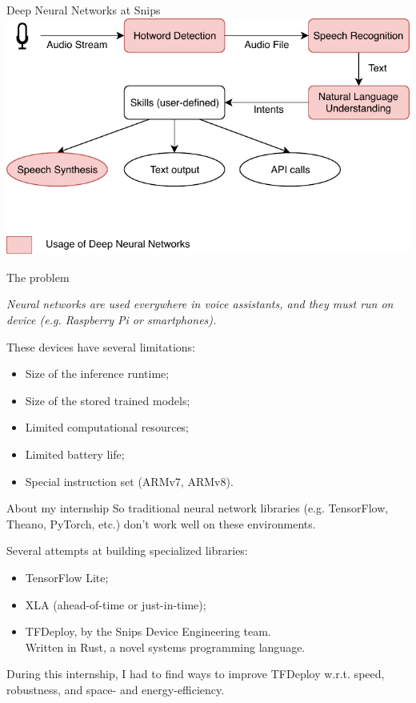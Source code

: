 \documentclass{beamer}
\begin{document}
\begin{frame}{Deep Neural Networks at Snips}
\centering
\vspace{1em}
\includegraphics[width=.9\textwidth]{snips-pipeline.pdf}
\end{frame}

\begin{frame}{The problem}
    \begin{block}{}
    \textit{Neural networks are used everywhere in voice assistants, and they must run on device (e.g. Raspberry Pi or smartphones).}
    \end{block}
    
    \bigskip
    These devices have several limitations:
    \begin{itemize}
        \item Size of the inference runtime;
        \item Size of the stored trained models;
        \item Limited computational resources;
        \item Limited battery life;
        \item Special instruction set (ARMv7, ARMv8).
    \end{itemize}
\end{frame}

\begin{frame}{About my internship}
So traditional neural network libraries (e.g. TensorFlow, Theano, PyTorch, etc.) don't work well on these environments.\\


Several attempts at building specialized libraries:
\begin{itemize}
    \item TensorFlow Lite;
    \item XLA (ahead-of-time or just-in-time);
    \item TFDeploy, by the Snips Device Engineering team.\\ Written in Rust, a novel systems programming language.
\end{itemize}

\bigskip
During this internship, I had to find ways to improve TFDeploy w.r.t. speed, robustness, and space- and energy-efficiency.
\end{frame}
\end{document}
